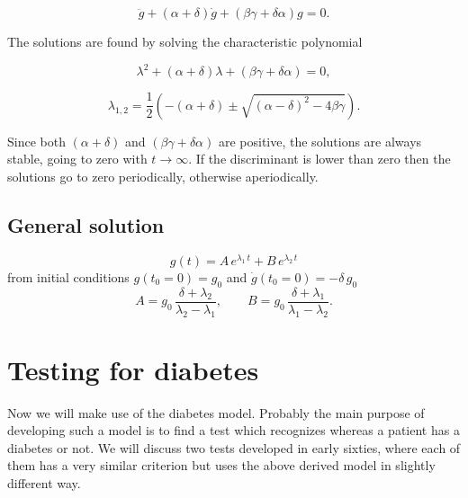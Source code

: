 \documentclass{article}
\begin{document}
\begin{equation}
	\label{Eq:secondOrderDE}
	\ddot g+(\alpha+\delta)\dot g+(\beta \gamma+\delta \alpha)g=0.
\end{equation}

The solutions are found by solving the characteristic polynomial

\begin{equation}
	\label{Eq:charEqn}
	\lambda^2+(\alpha+\delta)\lambda+(\beta\gamma+\delta\alpha)=0,
\end{equation}

\begin{equation}
	\label{Eq:rootsOfCharEqn}
	\lambda_{1,2}=\frac{1}{2}\left(-(\alpha+\delta)\pm \sqrt{(\alpha-\delta)^2-4\beta\gamma}\right).
\end{equation}

Since both $(\alpha+\delta)$ and $(\beta\gamma+\delta\alpha)$ are positive, the solutions are always stable, going to zero with $t\rightarrow \infty$. If the discriminant is lower than zero then the solutions go to zero periodically, otherwise aperiodically.

\subsection*{General solution}
\begin{equation}
	\label{Eq:genSol}
	g(t) = A\,e^{\lambda_1 \, t} + B\,e^{\lambda_2 \, t}
\end{equation}
from initial conditions $g(t_0=0) = g_0$ and $\dot{g}(t_0=0) = -\delta \, g_0$
\begin{equation*}
	\label{Eq:genSolParams}
	A = g_0\,\frac{\delta+\lambda_2}{\lambda_2-\lambda_1}, \qquad B = g_0\,\frac{\delta+\lambda_1}{\lambda_1-\lambda_2}.
\end{equation*}



\section{Testing for diabetes}
Now we will make use of the diabetes model. Probably the main purpose of developing such a model is to find a test which recognizes whereas a patient has a diabetes or not. We will discuss two tests developed in early sixties, where each of them has a very similar criterion but uses the above derived model in slightly different way.
\end{document}
